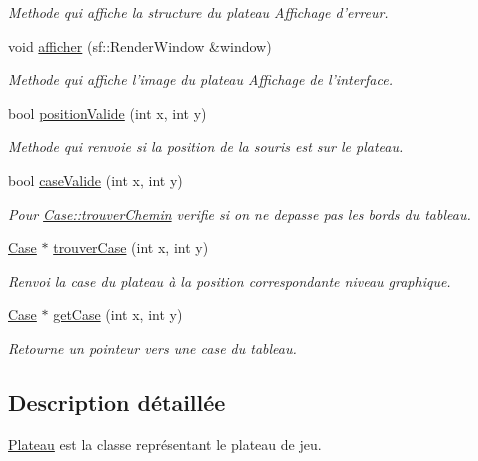 \begin{DoxyCompactItemize}
\begin{DoxyCompactList}\small\item\em \-Methode qui affiche la structure du plateau \-Affichage d'erreur. \end{DoxyCompactList}\item 
void \hyperlink{classPlateau_a583f37e119a4951cb03b9e5f9ed5b253}{afficher} (sf\-::\-Render\-Window \&window)
\begin{DoxyCompactList}\small\item\em \-Methode qui affiche l'image du plateau \-Affichage de l'interface. \end{DoxyCompactList}\item 
bool \hyperlink{classPlateau_a455da594b748a1bbd616537cfb6c5cd5}{position\-Valide} (int x, int y)
\begin{DoxyCompactList}\small\item\em \-Methode qui renvoie si la position de la souris est sur le plateau. \end{DoxyCompactList}\item 
bool \hyperlink{classPlateau_a2feeabd9398101b680bc647fb79b5271}{case\-Valide} (int x, int y)
\begin{DoxyCompactList}\small\item\em \-Pour \hyperlink{classCase_affe73b57a2c81e2f09dc5db45893db3c}{\-Case\-::trouver\-Chemin} verifie si on ne depasse pas les bords du tableau. \end{DoxyCompactList}\item 
\hyperlink{classCase}{\-Case} $\ast$ \hyperlink{classPlateau_ae53f9bb42a1689cb628e7075da5fdb47}{trouver\-Case} (int x, int y)
\begin{DoxyCompactList}\small\item\em \-Renvoi la case du plateau à la position correspondante niveau graphique. \end{DoxyCompactList}\item 
\hyperlink{classCase}{\-Case} $\ast$ \hyperlink{classPlateau_a009b129c0afc68b42ac80a7b0db92d52}{get\-Case} (int x, int y)
\begin{DoxyCompactList}\small\item\em \-Retourne un pointeur vers une case du tableau. \end{DoxyCompactList}\end{DoxyCompactItemize}


\subsection{\-Description détaillée}
\hyperlink{classPlateau}{\-Plateau} est la classe représentant le plateau de jeu. 

